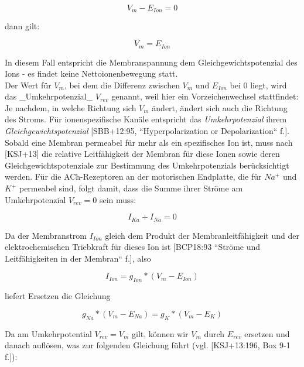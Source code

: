 {{\begin{equation}
V_m - E_{Ion} = 0
\end{equation}

dann gilt:

\begin{equation}
V_m = E_{Ion}
\end{equation}

In diesem Fall entspricht die Membranspannung dem Gleichgewichtspotenzial des Ions - es findet keine Nettoionenbewegung statt.\\

Der Wert für $V_m$, bei dem die Differenz zwischen $V_m$ und $E_{Ion}$ bei $0$ liegt, wird das _Umkehrpotenzial_ $V_{rev}$ genannt, weil hier ein Vorzeichenwechsel stattfindet: Je nachdem, in welche Richtung sich $V_m$ ändert, ändert sich auch die Richtung des Stroms. 
Für ionenspezifische Kanäle entspricht das \textit{Umkehrpotenzial} ihrem \textit{Gleichgewichtspotenzial} [SBB+12:95, ``Hyperpolarization or Depolarization`` f.].\\

Sobald eine Membran permeabel für mehr als ein spezifisches Ion ist, muss nach [KSJ+13] die relative Leitfähigkeit der Membran für diese Ionen sowie deren Gleichgewichtspotenziale zur Bestimmung des Umkehrpotenzials berücksichtigt werden. 
Für die ACh-Rezeptoren an der motorischen Endplatte\footnotemark[64], die für $Na^+$ und $K^+$ permeabel sind, folgt damit, dass die Summe ihrer Ströme am Umkehrpotenzial $V_{rev} = 0$ sein muss:

\begin{equation}
I_{Ka} + I_{Na} = 0
\end{equation}

Da der Membranstrom $I_{Ion}$ gleich dem Produkt der Membranleitfähigkeit und der elektrochemischen Triebkraft für dieses Ion ist [BCP18:93 ``Ströme und Leitfähigkeiten in der Membran`` f.], also

\begin{equation}
I_{Ion} = g_{Ion} * (V_m - E_{Ion})
\end{equation}

liefert Ersetzen die Gleichung

\begin{equation}
g_{Na} * (V_m - E_{Na}) = g_{K} * (V_m - E_{K})
\end{equation}

Da am Umkehrpotential $V_{rev} = V_m$ gilt, können wir $V_m$ durch $E_{rev}$ ersetzen und danach auflösen, was zur folgenden Gleichung führt (vgl. [KSJ+13:196, Box 9-1 f.]):

}}
